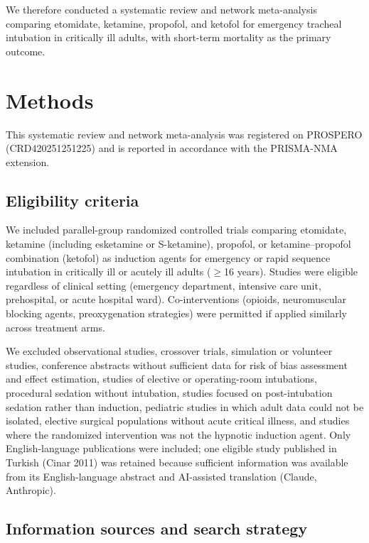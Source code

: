 \documentclass[11pt]{article}
\begin{document}
We therefore conducted a systematic review and network meta-analysis comparing etomidate, ketamine, propofol, and ketofol for emergency tracheal intubation in critically ill adults, with short-term mortality as the primary outcome.

\section{Methods}

This systematic review and network meta-analysis was registered on PROSPERO (CRD42025\allowbreak{}1251225) and is reported in accordance with the PRISMA-NMA extension.\cite{hutton2015}

\subsection{Eligibility criteria}

We included parallel-group randomized controlled trials comparing etomidate, ketamine (including esketamine or S-ketamine), propofol, or ketamine--propofol combination (ketofol) as induction agents for emergency or rapid sequence intubation in critically ill or acutely ill adults ($\geq$16 years). Studies were eligible regardless of clinical setting (emergency department, intensive care unit, prehospital, or acute hospital ward). Co-interventions (opioids, neuromuscular blocking agents, preoxygenation strategies) were permitted if applied similarly across treatment arms.

We excluded observational studies, crossover trials, simulation or volunteer studies, conference abstracts without sufficient data for risk of bias assessment and effect estimation, studies of elective or operating-room intubations, procedural sedation without intubation, studies focused on post-intubation sedation rather than induction, pediatric studies in which adult data could not be isolated, elective surgical populations without acute critical illness, and studies where the randomized intervention was not the hypnotic induction agent. Only English-language publications were included; one eligible study published in Turkish (Cinar 2011\cite{cinar2011}) was retained because sufficient information was available from its English-language abstract and AI-assisted translation (Claude, Anthropic).

\subsection{Information sources and search strategy}
\end{document}

